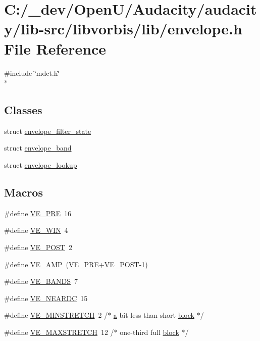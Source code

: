 \hypertarget{lib-src_2libvorbis_2lib_2_envelope_8h}{}\section{C\+:/\+\_\+dev/\+Open\+U/\+Audacity/audacity/lib-\/src/libvorbis/lib/envelope.h File Reference}
\label{lib-src_2libvorbis_2lib_2_envelope_8h}
{\ttfamily \#include \char`\"{}mdct.\+h\char`\"{}}\\*
\subsection*{Classes}
\begin{DoxyCompactItemize}
\item 
struct \hyperlink{structenvelope__filter__state}{envelope\+\_\+filter\+\_\+state}
\item 
struct \hyperlink{structenvelope__band}{envelope\+\_\+band}
\item 
struct \hyperlink{structenvelope__lookup}{envelope\+\_\+lookup}
\end{DoxyCompactItemize}
\subsection*{Macros}
\begin{DoxyCompactItemize}
\item 
\#define \hyperlink{lib-src_2libvorbis_2lib_2_envelope_8h_a26fae20853528294111d2f340f3f5f69}{V\+E\+\_\+\+P\+RE}~16
\item 
\#define \hyperlink{lib-src_2libvorbis_2lib_2_envelope_8h_a0e57f05d7e300421347526a10c1dfc68}{V\+E\+\_\+\+W\+IN}~4
\item 
\#define \hyperlink{lib-src_2libvorbis_2lib_2_envelope_8h_a4aa79e67b4b1d81a40d1fd31e645313f}{V\+E\+\_\+\+P\+O\+ST}~2
\item 
\#define \hyperlink{lib-src_2libvorbis_2lib_2_envelope_8h_acf538c31f9e77691dbcb48a5a003759c}{V\+E\+\_\+\+A\+MP}~(\hyperlink{lib-src_2libvorbis_2lib_2_envelope_8h_a26fae20853528294111d2f340f3f5f69}{V\+E\+\_\+\+P\+RE}+\hyperlink{lib-src_2libvorbis_2lib_2_envelope_8h_a4aa79e67b4b1d81a40d1fd31e645313f}{V\+E\+\_\+\+P\+O\+ST}-\/1)
\item 
\#define \hyperlink{lib-src_2libvorbis_2lib_2_envelope_8h_a9309f3ce540b562a832e378b7f58d807}{V\+E\+\_\+\+B\+A\+N\+DS}~7
\item 
\#define \hyperlink{lib-src_2libvorbis_2lib_2_envelope_8h_a5a9e7af3414651af544cd6eced7c6e1e}{V\+E\+\_\+\+N\+E\+A\+R\+DC}~15
\item 
\#define \hyperlink{lib-src_2libvorbis_2lib_2_envelope_8h_a9fd35b615d0f20486b08088172df3049}{V\+E\+\_\+\+M\+I\+N\+S\+T\+R\+E\+T\+CH}~2   /$\ast$ \hyperlink{rfft2d_test_m_l_8m_a4124bc0a9335c27f086f24ba207a4912}{a} bit less than short \hyperlink{structblock}{block} $\ast$/
\item 
\#define \hyperlink{lib-src_2libvorbis_2lib_2_envelope_8h_ae2e4be21153cbfea5395d811c0a35e95}{V\+E\+\_\+\+M\+A\+X\+S\+T\+R\+E\+T\+CH}~12  /$\ast$ one-\/third full \hyperlink{structblock}{block} $\ast$/
\end{DoxyCompactItemize}
